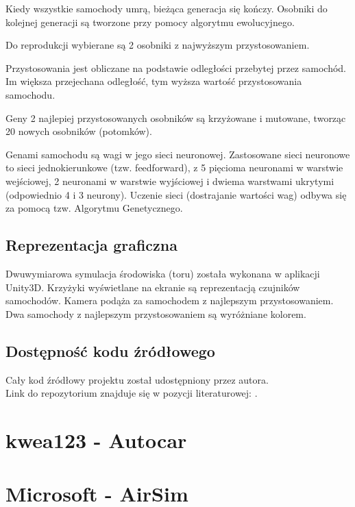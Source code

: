 Kiedy wszystkie samochody umrą, bieżąca generacja się kończy.
Osobniki do kolejnej generacji są tworzone przy pomocy algorytmu ewolucyjnego.

Do reprodukcji wybierane są 2 osobniki z najwyższym przystosowaniem.

Przystosowania jest obliczane na podstawie odległości przebytej przez samochód.
Im większa przejechana odległość, tym wyższa wartość przystosowania samochodu.

Geny 2 najlepiej przystosowanych osobników są krzyżowane i mutowane, tworząc 20 nowych osobników (potomków).

Genami samochodu są wagi w jego sieci neuronowej.
Zastosowane sieci neuronowe to sieci jednokierunkowe (tzw. feedforward),
z 5 pięcioma neuronami w warstwie wejściowej, 2 neuronami w warstwie wyjściowej i dwiema warstwami ukrytymi (odpowiednio 4 i 3 neurony).
Uczenie sieci (dostrajanie wartości wag) odbywa się za pomocą tzw. Algorytmu Genetycznego.

\subsection{Reprezentacja graficzna}
Dwuwymiarowa symulacja środowiska (toru) została wykonana w aplikacji Unity3D.
Krzyżyki wyświetlane na ekranie są reprezentacją czujników samochodów.
Kamera podąża za samochodem z najlepszym przystosowaniem.
Dwa samochody z najlepszym przystosowaniem są wyróżniane kolorem.

\subsection{Dostępność kodu źródłowego}
Cały kod źródłowy projektu został udostępniony przez autora. \\
Link do repozytorium znajduje się w pozycji literaturowej:  \cite{artz:deepLearningCars:github}.
\section{kwea123 - Autocar}
\section{Microsoft - AirSim}